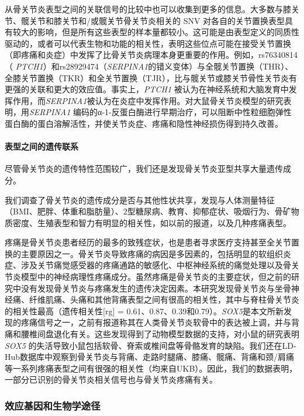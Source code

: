 从骨关节炎表型之间的关联信号的比较中也可以收集到更多的信息。大多数与膝关节、髋关节和膝关节和/或髋关节骨关节炎相关的
SNV
对各自的关节置换表型具有较大的影响，但是所有这些表型的样本量都较小。这可能是由表型定义的同质性驱动的，或者可以代表生物和功能的相关性，表明这些位点可能在接受关节置换（即疼痛和炎症）中发挥了比骨关节炎病理本身更重要的作用。例如，rs76340814（\emph{
PTCH1}）和rs28929474（\emph{SERPINA1}的错义变体）与全髋关节置换（THR）、全膝关节置换（TKR）和全关节置换（TJR），比与髋关节或膝关节骨性关节炎有更强的关联和更大的效应值。事实上，\emph{PTCH1}
被认为在神经系统和大脑发育中发挥作用，而\emph{SERPINA1}被认为在炎症中发挥作用。对大鼠骨关节炎模型的研究表明，用\emph{SERPINA1}
编码的α-1-反蛋白酶进行早期治疗，可以阻断中性粒细胞弹性蛋白酶的蛋白溶解活性，并使关节炎症、疼痛和隐性神经损伤得到持久改善。

\paragraph*{表型之间的遗传联系}

尽管骨关节炎的遗传特性范围较广，我们还是发现骨关节炎亚型共享大量遗传成分。

我们调查了骨关节炎的遗传成分是否与其他性状共享，发现与人体测量特征（BMI、肥胖、体重和脂肪量）、2型糖尿病、教育、抑郁症状、吸烟行为、骨矿物质密度、生殖表型和智力有明显的相关性，如以前的报道，以及几种疼痛表型。

疼痛是骨关节炎患者经历的最多的致残症状，也是患者寻求医疗支持甚至全关节置换的主要原因之一。骨关节炎导致疼痛的病因是多因素的，包括明显的软组织炎症、涉及关节痛觉感受器的疼痛通路的敏感化、中枢神经系统的痛觉处理以及骨关节炎模型中的神经病理性疼痛成分。虽然疼痛是骨关节炎的主要症状，但之前的研究中没有发现骨关节炎与疼痛发生的遗传决定因素。本研究发现骨关节炎与坐骨神经痛、纤维肌痛、头痛和其他背痛表型之间有很高的相关性，其中与脊柱骨关节炎的相关性最高（遗传相关性{[}rg{]}
=
0.61、0.87、0.39和0.79）。\emph{SOX5}是本文所新发现的疼痛信号之一，之前有报道称其在人类骨关节炎软骨中的表达被上调，并与背痛和腰椎间盘退化有关。这些发现得到了动物模型数据的支持，对小鼠的研究表明\emph{SOX5}
的失活导致小鼠包括软骨、脊索或椎间盘等骨骼发育的缺陷。我们还在LD-Hub数据库中观察到骨关节炎与背痛、走路时腿痛、膝痛、髋痛、背痛和颈/肩痛等一系列疼痛表型之间有很强的相关性（均来自UKB）。因此，我们的数据表明，一部分已识别的骨关节炎相关信号也与骨关节炎疼痛有关。

\subsubsection*{效应基因和生物学途径}

